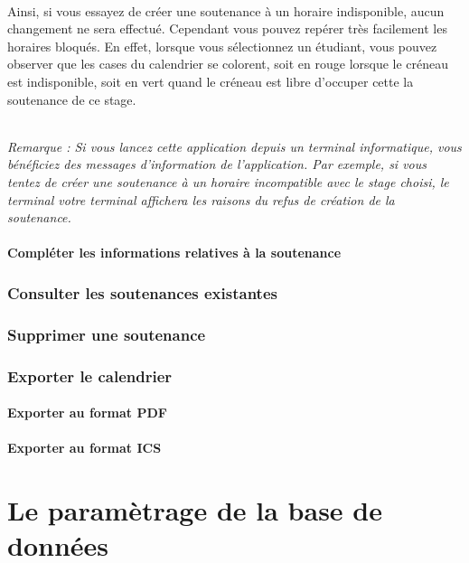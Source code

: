 \documentclass[a4paper,10pt]{book}
\begin{document}
	\paragraph{}
	  Ainsi, si vous essayez de créer une soutenance à un horaire indisponible, aucun changement ne sera effectué.
	  Cependant vous pouvez repérer très facilement les horaires bloqués.
	  En effet, lorsque vous sélectionnez un étudiant, vous pouvez observer que les cases du calendrier se colorent, soit en rouge lorsque le créneau est indisponible, soit en vert quand le créneau est libre d'occuper cette la soutenance de ce stage.
	  
	  \paragraph{}
	    \textit{Remarque : Si vous lancez cette application depuis un terminal informatique, vous bénéficiez des messages d'information de l'application. Par exemple, si vous tentez de créer une soutenance à un horaire incompatible avec le stage choisi, le terminal votre terminal affichera les raisons du refus de création de la soutenance.}
	  
	  
	  
	
      \subsection{Compléter les informations relatives à la soutenance}
    \section{Consulter les soutenances existantes}
    \section{Supprimer une soutenance}
    \section{Exporter le calendrier}
      \subsection{Exporter au format PDF}
      \subsection{Exporter au format ICS}
\part{Le paramètrage de la base de données}
\end{document}
